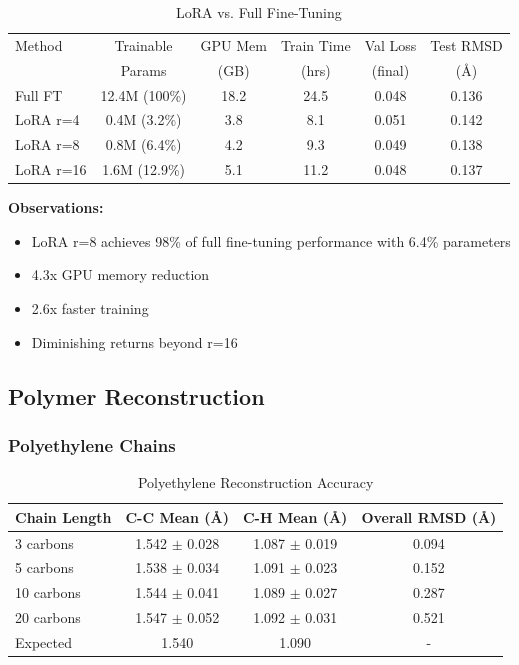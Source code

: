 \documentclass[11pt,a4paper]{article}
\begin{document}
\begin{table}[h]
\centering
\caption{LoRA vs. Full Fine-Tuning}
\begin{tabular}{lccccc}
\toprule
Method & Trainable & GPU Mem & Train Time & Val Loss & Test RMSD \\
 & Params & (GB) & (hrs) & (final) & (Å) \\
\midrule
Full FT & 12.4M (100\%) & 18.2 & 24.5 & 0.048 & 0.136 \\
LoRA r=4 & 0.4M (3.2\%) & 3.8 & 8.1 & 0.051 & 0.142 \\
LoRA r=8 & 0.8M (6.4\%) & 4.2 & 9.3 & 0.049 & 0.138 \\
LoRA r=16 & 1.6M (12.9\%) & 5.1 & 11.2 & 0.048 & 0.137 \\
\bottomrule
\end{tabular}
\end{table}

\textbf{Observations:}
\begin{itemize}
    \item LoRA r=8 achieves 98\% of full fine-tuning performance with 6.4\% parameters
    \item 4.3x GPU memory reduction
    \item 2.6x faster training
    \item Diminishing returns beyond r=16
\end{itemize}

\subsection{Polymer Reconstruction}

\subsubsection{Polyethylene Chains}

\begin{table}[h]
\centering
\caption{Polyethylene Reconstruction Accuracy}
\begin{tabular}{lccc}
\toprule
Chain Length & C-C Mean (Å) & C-H Mean (Å) & Overall RMSD (Å) \\
\midrule
3 carbons & 1.542 $\pm$ 0.028 & 1.087 $\pm$ 0.019 & 0.094 \\
5 carbons & 1.538 $\pm$ 0.034 & 1.091 $\pm$ 0.023 & 0.152 \\
10 carbons & 1.544 $\pm$ 0.041 & 1.089 $\pm$ 0.027 & 0.287 \\
20 carbons & 1.547 $\pm$ 0.052 & 1.092 $\pm$ 0.031 & 0.521 \\
\midrule
Expected & 1.540 & 1.090 & - \\
\bottomrule
\end{tabular}
\end{table}
\end{document}
